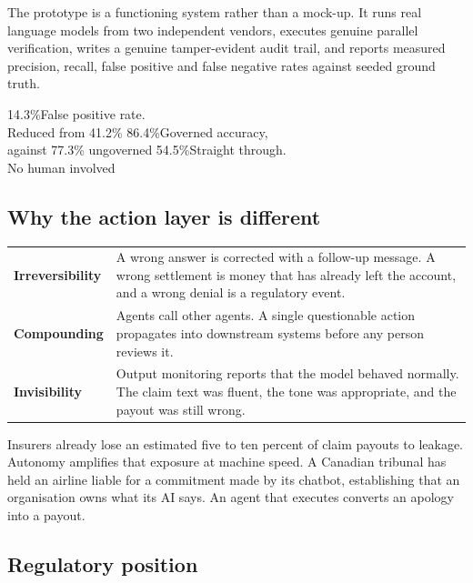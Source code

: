 \documentclass[10pt]{article}
\begin{document}
The prototype is a functioning system rather than a mock-up. It runs real language models
from two independent vendors, executes genuine parallel verification, writes a genuine
tamper-evident audit trail, and reports measured precision, recall, false positive and
false negative rates against seeded ground truth.

     {14.3\%}{False positive rate.\\Reduced from 41.2\%}
     {86.4\%}{Governed accuracy,\\against 77.3\% ungoverned}
     {54.5\%}{Straight through.\\No human involved}

\subsection{Why the action layer is different}

\vspace{2pt}
{\small
\begin{xltabular}{\textwidth}{@{}L{0.20\textwidth}Y@{}}
\toprule
{} &  \\
\midrule
\textbf{Irreversibility} & A wrong answer is corrected with a follow-up message. A wrong settlement is money that has already left the account, and a wrong denial is a regulatory event. \\
\textbf{Compounding} & Agents call other agents. A single questionable action propagates into downstream systems before any person reviews it. \\
\textbf{Invisibility} & Output monitoring reports that the model behaved normally. The claim text was fluent, the tone was appropriate, and the payout was still wrong. \\
\bottomrule
\end{xltabular}}

Insurers already lose an estimated five to ten percent of claim payouts to leakage.
Autonomy amplifies that exposure at machine speed. A Canadian tribunal has held an
airline liable for a commitment made by its chatbot, establishing that an organisation
owns what its AI says. An agent that executes converts an apology into a payout.

\subsection{Regulatory position}
\end{document}
